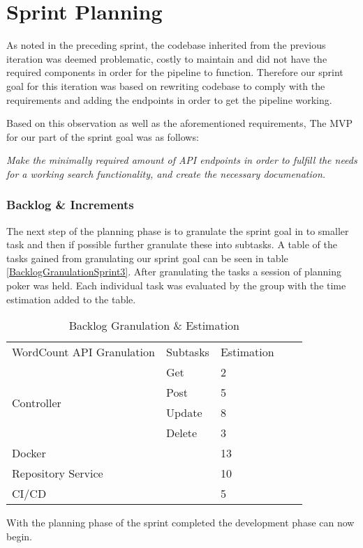 \section{Sprint Planning}
As noted in the preceding sprint, the codebase inherited from the previous iteration was deemed problematic, costly to maintain and did not have the required components in order for the pipeline to function. 
Therefore our sprint goal for this iteration was based on rewriting codebase to comply with the requirements and adding the endpoints in order to get the pipeline working. 


Based on this observation as well as the aforementioned requirements, The MVP for our part of the sprint goal was as follows:
\vspace{\baselineskip}

\textit{Make the minimally required amount of API endpoints in order to fulfill the needs for a working search functionality, and create the necessary documenation.}

\subsubsection{Backlog \& Increments}
The next step of the planning phase is to granulate the sprint goal in to smaller task and then if possible further granulate these into subtasks. 
A table of the tasks gained from granulating our sprint goal can be seen in table \ref{BacklogGranulationSprint3}. 
After granulating the tasks a session of planning poker was held. Each individual task was evaluated by the group with the time estimation added to the table. 
\begin{table}[h]
\centering
\begin{tabular}{|l|l|l|ll}
\cline{1-3}
WordCount API Granulation   & Subtasks & Estimation &  &  \\ \cline{1-3}
\multirow{4}{*}{Controller} & Get      & 2          &  &  \\ \cline{2-3}
                            & Post     & 5          &  &  \\ \cline{2-3}
                            & Update   & 8          &  &  \\ \cline{2-3}
                            & Delete   & 3          &  &  \\ \cline{1-3}
Docker                      &          & 13         &  &  \\ \cline{1-3}
Repository Service          &          & 10         &  &  \\ \cline{1-3}
CI/CD                       &          & 5          &  &  \\ \cline{1-3}
\end{tabular}
\caption{Backlog Granulation \& Estimation}
\label{BacklogEstimationSprint3}
\end{table}

With the planning phase of the sprint completed the development phase can now begin. 




